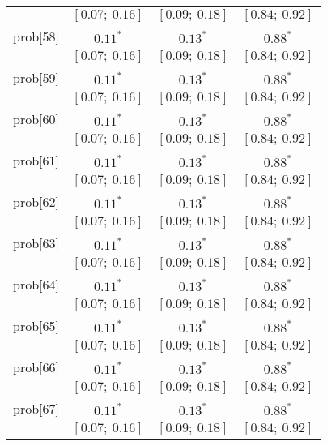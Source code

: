 \begin{table}
\begin{center}
\begin{tabular}{l c c c }
          & $[0.07;\ 0.16]$         & $[0.09;\ 0.18]$         & $[0.84;\ 0.92]$       \\
prob[58]  & $0.11^{*}$              & $0.13^{*}$              & $0.88^{*}$            \\
          & $[0.07;\ 0.16]$         & $[0.09;\ 0.18]$         & $[0.84;\ 0.92]$       \\
prob[59]  & $0.11^{*}$              & $0.13^{*}$              & $0.88^{*}$            \\
          & $[0.07;\ 0.16]$         & $[0.09;\ 0.18]$         & $[0.84;\ 0.92]$       \\
prob[60]  & $0.11^{*}$              & $0.13^{*}$              & $0.88^{*}$            \\
          & $[0.07;\ 0.16]$         & $[0.09;\ 0.18]$         & $[0.84;\ 0.92]$       \\
prob[61]  & $0.11^{*}$              & $0.13^{*}$              & $0.88^{*}$            \\
          & $[0.07;\ 0.16]$         & $[0.09;\ 0.18]$         & $[0.84;\ 0.92]$       \\
prob[62]  & $0.11^{*}$              & $0.13^{*}$              & $0.88^{*}$            \\
          & $[0.07;\ 0.16]$         & $[0.09;\ 0.18]$         & $[0.84;\ 0.92]$       \\
prob[63]  & $0.11^{*}$              & $0.13^{*}$              & $0.88^{*}$            \\
          & $[0.07;\ 0.16]$         & $[0.09;\ 0.18]$         & $[0.84;\ 0.92]$       \\
prob[64]  & $0.11^{*}$              & $0.13^{*}$              & $0.88^{*}$            \\
          & $[0.07;\ 0.16]$         & $[0.09;\ 0.18]$         & $[0.84;\ 0.92]$       \\
prob[65]  & $0.11^{*}$              & $0.13^{*}$              & $0.88^{*}$            \\
          & $[0.07;\ 0.16]$         & $[0.09;\ 0.18]$         & $[0.84;\ 0.92]$       \\
prob[66]  & $0.11^{*}$              & $0.13^{*}$              & $0.88^{*}$            \\
          & $[0.07;\ 0.16]$         & $[0.09;\ 0.18]$         & $[0.84;\ 0.92]$       \\
prob[67]  & $0.11^{*}$              & $0.13^{*}$              & $0.88^{*}$            \\
          & $[0.07;\ 0.16]$         & $[0.09;\ 0.18]$         & $[0.84;\ 0.92]$       \\

\end{tabular}
\end{center}
\end{table}
